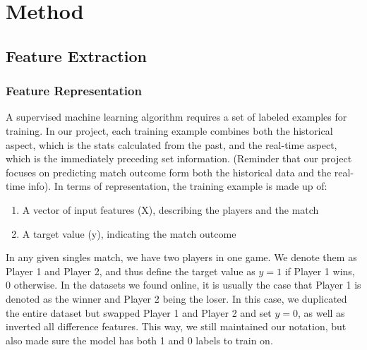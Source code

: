 \documentclass[paper=a4, fontsize=11pt]{scrartcl} %
\numberwithin{equation}{section} %
\numberwithin{figure}{section} %
\numberwithin{table}{section} %
\begin{document}
\section{Method}
\subsection{Feature Extraction}
\subsubsection{Feature Representation}
\label{sec:label}
A supervised machine learning algorithm requires a set of labeled examples for training. In our project, each training example combines both the historical aspect, which is the stats calculated from the past, and the real-time aspect, which is the immediately preceding set information. (Reminder that our project focuses on predicting match outcome form both the historical data and the real-time info). In terms of representation, the training example is made up of:
\begin{enumerate}
\item A vector of input features (X), describing the players and the match
\item A target value (y), indicating the match outcome
\end{enumerate}
In any given singles match, we have two players in one game. We denote them as Player 1 and Player 2, and thus define the target value as 
$y = 1$ if Player 1 wins, 0 otherwise. In the datasets we found online, it is usually the case that Player 1 is denoted as the winner and Player 2 being the loser. In this case, we duplicated the entire dataset but swapped Player 1 and Player 2 and set $y = 0$, as well as inverted all difference features. This way, we still maintained our notation, but also made sure the model has both 1 and 0 labels to train on. 
\end{document}
